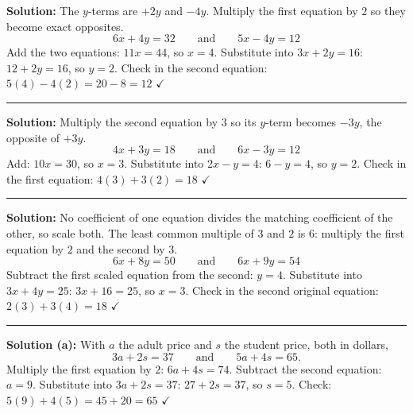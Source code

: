 \documentclass[12pt]{article}
\begin{document}



\textbf{Solution:} The $y$-terms are $+2y$ and $-4y$. Multiply the first equation by $2$ so they become exact opposites.
\[ 6x + 4y = 32 \qquad\text{and}\qquad 5x - 4y = 12 \]
Add the two equations: $11x = 44$, so $x = 4$. Substitute into $3x + 2y = 16$: $12 + 2y = 16$, so $y = 2$. Check in the second equation: $5(4) - 4(2) = 20 - 8 = 12$ $\checkmark$ 

\vspace{0.2cm}\noindent\rule{\linewidth}{0.2pt}


\textbf{Solution:} Multiply the second equation by $3$ so its $y$-term becomes $-3y$, the opposite of $+3y$.
\[ 4x + 3y = 18 \qquad\text{and}\qquad 6x - 3y = 12 \]
Add: $10x = 30$, so $x = 3$. Substitute into $2x - y = 4$: $6 - y = 4$, so $y = 2$. Check in the first equation: $4(3) + 3(2) = 18$ $\checkmark$ 

\vspace{0.2cm}\noindent\rule{\linewidth}{0.2pt}


\textbf{Solution:} No coefficient of one equation divides the matching coefficient of the other, so scale both. The least common multiple of $3$ and $2$ is $6$: multiply the first equation by $2$ and the second by $3$.
\[ 6x + 8y = 50 \qquad\text{and}\qquad 6x + 9y = 54 \]
Subtract the first scaled equation from the second: $y = 4$. Substitute into $3x + 4y = 25$: $3x + 16 = 25$, so $x = 3$. Check in the second original equation: $2(3) + 3(4) = 18$ $\checkmark$ 

\vspace{0.2cm}\noindent\rule{\linewidth}{0.2pt}


\textbf{Solution (a):} With $a$ the adult price and $s$ the student price, both in dollars,
\[ 3a + 2s = 37 \qquad\text{and}\qquad 5a + 4s = 65. \]
Multiply the first equation by $2$: $6a + 4s = 74$. Subtract the second equation: $a = 9$. Substitute into $3a + 2s = 37$: $27 + 2s = 37$, so $s = 5$. Check: $5(9) + 4(5) = 45 + 20 = 65$ $\checkmark$ 
\end{document}
